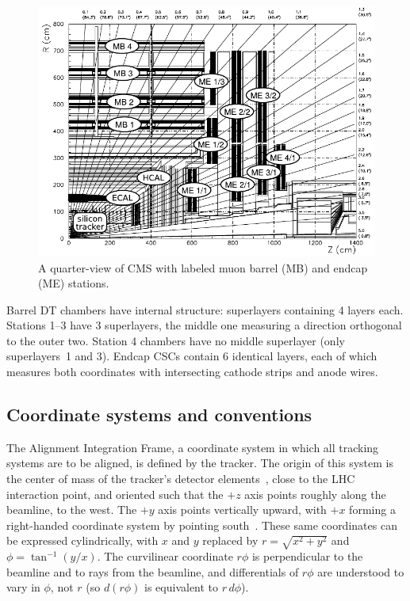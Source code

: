 \begin{figure}
\includegraphics[height=\linewidth, angle=90]{plots/intro_geom/muon_system_labeled.pdf}

\caption{A quarter-view of CMS with labeled muon barrel (MB) and endcap (ME) stations. \label{fig:muon_system_labeled}}
\end{figure}

Barrel DT chambers have internal structure: superlayers
containing 4 layers each.  Stations 1--3 have 3 superlayers, the
middle one measuring a direction orthogonal to the outer
two.  Station 4 chambers have no middle superlayer (only superlayers~1
and 3).  Endcap CSCs contain 6 identical layers, each of which
measures both coordinates with intersecting cathode strips and anode
wires.

\subsection{Coordinate systems and conventions}

The Alignment Integration Frame, a coordinate system in which all
tracking systems are to be aligned, is defined by the 
tracker.  The origin of this system is the center of mass of the
tracker's detector elements~\cite{ref:tracker_alignment}, close to the
LHC interaction point, and oriented such that the $+z$ axis points
roughly along the beamline, to the west.  The $+y$ axis points
vertically upward, with $+x$ forming a right-handed coordinate system
by pointing south~\cite{ref:twikiCMSConventions}.  These same
coordinates can be expressed cylindrically, with $x$ and $y$ replaced
by $r = \sqrt{x^2 + y^2}$ and $\phi = \tan^{-1}(y/x)$.  The
curvilinear coordinate $r\phi$ is perpendicular to the beamline and
to rays from the beamline, and differentials of $r\phi$ are understood to
vary in $\phi$, not $r$ (so $d(r\phi)$ is equivalent to $r \, d\phi$).

